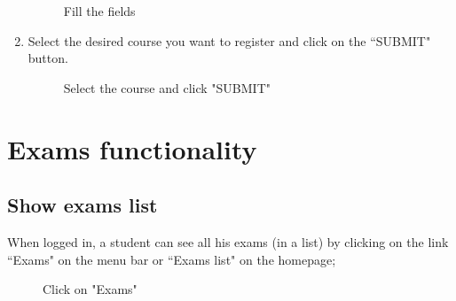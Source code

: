 \documentclass[ManualeUtente]{subfiles}
\begin{document}
\begin{enumerate}
\begin{figure}[H]
		\caption{Fill the fields}
		\label{fig:Fill the fields}
	\end{figure}
	\item Select the desired course you want to register and click on the \textquotedblleft SUBMIT" button.
	\begin{figure}[H]
		\centering
		\caption{Select the course and click "SUBMIT"}
		\label{fig:Select the course and click "SUBMIT"}
	\end{figure}
\end{enumerate}

\newpage
\section{Exams functionality}
\subsection{Show exams list}
When logged in, a student can see all his exams (in a list) by clicking on the link \textquotedblleft Exams" on the menu bar or \textquotedblleft Exams list" on the homepage;
	\begin{figure}[H]
		\centering
		\caption{Click on "Exams"}
		\label{fig:Click on "Exams"}
	\end{figure}
\end{document}
